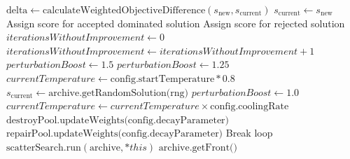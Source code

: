 \documentclass[a4paper,12pt]{article}
\begin{document}
\begin{algorithm}[H]
\begin{algorithmic}[1]
        \Else {}
            \State $\text{delta} \gets \text{calculateWeightedObjectiveDifference}(s_{\text{new}}, s_{\text{current}})$
                \State $s_{\text{current}} \gets s_{\text{new}}$
                \State Assign score for accepted dominated solution
            \Else
                \State Assign score for rejected solution
            \EndIf
        \EndIf
    \EndIf
    \State
        \State $iterationsWithoutImprovement \gets 0$
    \Else
        \State $iterationsWithoutImprovement \gets iterationsWithoutImprovement + 1$
    \EndIf
        \State $perturbationBoost \gets 1.5$ 
        \State $perturbationBoost \gets 1.25$
        \State $currentTemperature \gets \text{config.startTemperature} * 0.8$ 
            \State $s_{\text{current}} \gets \text{archive.getRandomSolution(rng)}$ 
        \EndIf
    \Else
        \State $perturbationBoost \gets 1.0$
    \EndIf
    \State
    \State $currentTemperature \gets currentTemperature \times \text{config.coolingRate}$
    \State
        \State $\text{destroyPool.updateWeights(config.decayParameter)}$
        \State $\text{repairPool.updateWeights(config.decayParameter)}$
            \State Break loop 
        \EndIf
    \EndIf
\EndFor
\State
{}
    \State $\text{scatterSearch.run}(\text{archive}, *this)$
\EndIf
\State
\State \Return $\text{archive.getFront()}$
\end{algorithmic}
\end{algorithm}
\end{document}

